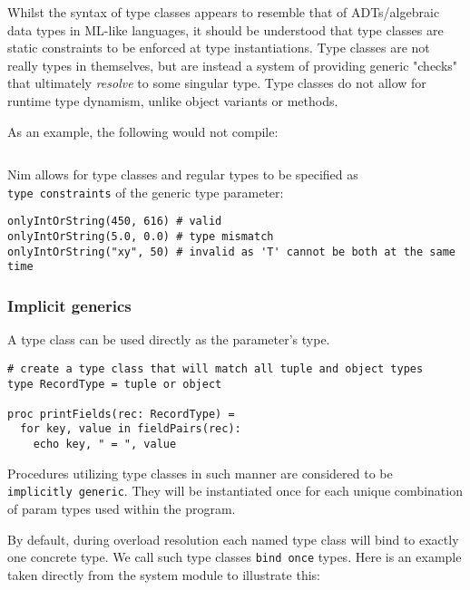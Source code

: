 Whilst the syntax of type classes appears to resemble that of
ADTs/algebraic data types in ML-like languages, it should be understood
that type classes are static constraints to be enforced at type
instantiations. Type classes are not really types in themselves, but are
instead a system of providing generic "checks" that ultimately
\emph{resolve} to some singular type. Type classes do not allow for
runtime type dynamism, unlike object variants or methods.

As an example, the following would not compile:

\begin{verbatim}
\end{verbatim}

Nim allows for type classes and regular types to be specified as
\texttt{type\ constraints} of the generic type parameter:

\begin{verbatim}
onlyIntOrString(450, 616) # valid
onlyIntOrString(5.0, 0.0) # type mismatch
onlyIntOrString("xy", 50) # invalid as 'T' cannot be both at the same time
\end{verbatim}

\hypertarget{implicit-generics}{%
\subsubsection{Implicit generics}\label{implicit-generics}}

A type class can be used directly as the parameter's type.

\begin{verbatim}
# create a type class that will match all tuple and object types
type RecordType = tuple or object

proc printFields(rec: RecordType) =
  for key, value in fieldPairs(rec):
    echo key, " = ", value
\end{verbatim}

Procedures utilizing type classes in such manner are considered to be
\texttt{implicitly\ generic}. They will be instantiated once for each
unique combination of param types used within the program.

By default, during overload resolution each named type class will bind
to exactly one concrete type. We call such type classes
\texttt{bind\ once} types. Here is an example taken directly from the
system module to illustrate this:

\begin{verbatim}
\end{verbatim}

